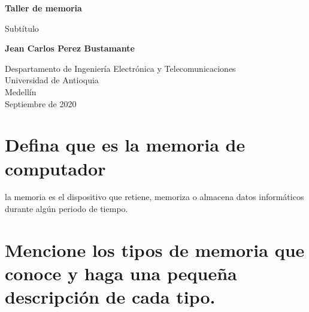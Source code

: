 \documentclass{article}
\begin{document}
\begin{titlepage}
    \begin{center}
        \vspace*{1cm}
            
        \Huge
        \textbf{Taller de memoria}
            
        \vspace{0.5cm}
        \LARGE
        Subtítulo
            
        \vspace{1.5cm}
            
        \textbf{Jean Carlos Perez Bustamante}
            
        \vfill
            
        \vspace{0.8cm}
            
        \Large
        Despartamento de Ingeniería Electrónica y Telecomunicaciones\\
        Universidad de Antioquia\\
        Medellín\\
        Septiembre de 2020
            
    \end{center}
\end{titlepage}



\section{Defina que es la memoria de computador}
la memoria es el dispositivo que retiene, memoriza o almacena datos informáticos durante algún periodo de tiempo.

\section{ Mencione los tipos de memoria que conoce y haga una pequeña descripción de cada tipo.}
\end{document}
